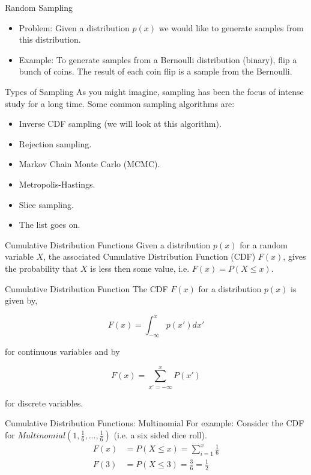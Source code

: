 \documentclass[serif,xcolor=pdftex,dvipsnames,table,hyperref={bookmarks=false,breaklinks}]{beamer}
\begin{document}
\begin{frame}[t]{Random Sampling}
	\begin{itemize}[<+->]
		\item Problem: Given a distribution $p(x)$ we would like to generate samples from this distribution.
		\item Example: To generate samples from a Bernoulli distribution (binary), flip a bunch of coins. The result of each coin flip is a sample from the Bernoulli.
	\end{itemize}
\end{frame}

\begin{frame}[t]{Types of Sampling}
	As you might imagine, sampling has been the focus of intense study for a long time. Some common sampling algorithms are:
	\pause
	\begin{itemize}[<+->]
		\item Inverse CDF sampling (we will look at this algorithm).
		\item Rejection sampling.
		\item Markov Chain Monte Carlo (MCMC).
		\item Metropolis-Hastings.
		\item Slice sampling.
		\item The list goes on.
	\end{itemize}
\end{frame}

\begin{frame}[t]{Cumulative Distribution Functions}
	Given a distribution $p(x)$ for a random variable $X$, the associated Cumulative Distribution Function (CDF) $F(x)$, gives the probability that $X$ is less then some value, i.e. $F(x) = P(X \leq x)$.
	
	\pause
	\begin{block}{Cumulative Distribution Function}
		The CDF $F(x)$ for a distribution $p(x)$ is given by,
		
		$$F(x) = \int_{-\infty}^x p(x') dx'$$
		
		for continuous variables and by
		
		$$F(x) = \sum_{x' = -\infty}^{x} P(x')$$
		
		for discrete variables.
	\end{block}
\end{frame}

\begin{frame}[t]{Cumulative Distribution Functions: Multinomial}
	For example: Consider the CDF for $Multinomial(1,\frac{1}{6},...,\frac{1}{6})$ (i.e. a six sided dice roll).
	\pause
	\begin{align*}
		F(x) &= P(X \leq x) = \sum_{i = 1}^{x} \frac{1}{6}\\
		F(3) &= P(X \leq 3) = \frac{3}{6} = \frac{1}{2}
	\end{align*}
	
	\pause
\end{frame}
\end{document}
